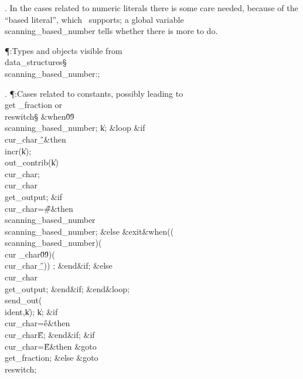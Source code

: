 . In the cases related to numeric literals there is some care needed,
because of the ``based literal'', which \ADA\ supports; a global
variable \\{scanning\_based\_number} tells whether there is more to do.

\Y\P\?\4:Types and objects visible from \\{data\_structures}\X\mathrel{+}\S%
\?\6
\\{scanning\_based\_number}\?:\?\?\K\?;\par
\fi

. \P\?:Cases related to constants, possibly leading to \\{get%
\_fraction} or \\{reswitch}\X\S\?\6
\4\&{when}\8\H{0}\?\to\?\H{9}\KR\6
\\{scanning\_based\_number}\?\K\?;\5
\|k\?\K{};\6
\1\&{loop}\6
\&{if}\1\1\8\\{cur\_char}\?\I\?\H{\_}\2\8\&{then}\6
\\{incr}\?\1(\?\|k\?\2)\?;\5
\\{out\_contrib}\?\1(\?\|k\?\2)\K\?\\{cur\_char};\5
\\{cur\_char}\?\K\?\\{get\_output};\6
\&{if}\1\1\8\\{cur\_char}\?=\?\H{\#}\2\8\&{then}\6
\\{scanning\_based\_number}\?\K\R\?\\{scanning\_based\_number};\6
\4\&{else}\6
\?\&{exit}\8\&{when}\8\1(\1(\R\?\\{scanning\_based\_number}\?\2)\W\1(\?\\{cur%
\_char}\?\notin\?\H{0}\?\to\?\H{9}\?\2)\W\1(\?\\{cur\_char}\?\I\?\H{\_}\?\2)\2)%
\?;\2\6
\&{end}\8\2\&{if}\1;\6
\4\&{else}\6
\\{cur\_char}\?\K\?\\{get\_output};\2\6
\&{end}\8\2\&{if}\1;\2\6
\&{end}\8\&{loop};\6
\\{send\_out}\?\1(\?\\{ident}\?,\?\|k\?\2)\?;\5
\|k\?\K{};\6
\&{if}\1\1\8\\{cur\_char}\?=\?\H{e}\2\8\&{then}\6
\\{cur\_char}\?\K\?\H{E};\2\6
\&{end}\8\2\&{if}\1;\6
\&{if}\1\1\8\\{cur\_char}\?=\?\H{E}\2\8\&{then}\6
\&{goto}\8\\{get\_fraction};\6
\4\&{else}\6
\&{goto}\8\\{reswitch};\2\6
